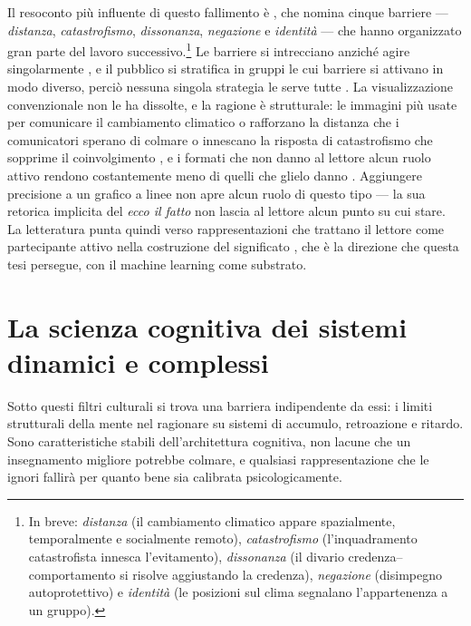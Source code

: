 Il resoconto più influente di questo fallimento è \citet{stoknes2015}, che nomina cinque barriere --- \emph{distanza}, \emph{catastrofismo}, \emph{dissonanza}, \emph{negazione} e \emph{identità} --- che hanno organizzato gran parte del lavoro successivo.\footnote{In breve: \emph{distanza} (il cambiamento climatico appare spazialmente, temporalmente e socialmente remoto), \emph{catastrofismo} (l'inquadramento catastrofista innesca l'evitamento), \emph{dissonanza} (il divario credenza--comportamento si risolve aggiustando la credenza), \emph{negazione} (disimpegno autoprotettivo) e \emph{identità} (le posizioni sul clima segnalano l'appartenenza a un gruppo).} Le barriere si intrecciano anziché agire singolarmente \citep{vanderlinden2015}, e il pubblico si stratifica in gruppi le cui barriere si attivano in modo diverso, perciò nessuna singola strategia le serve tutte \citep{leiserowitz2021}. La visualizzazione convenzionale non le ha dissolte, e la ragione è strutturale: le immagini più usate per comunicare il cambiamento climatico o rafforzano la distanza che i comunicatori sperano di colmare o innescano la risposta di catastrofismo che sopprime il coinvolgimento \citep{cornerclimate2015, nicholsoncole2005}, e i formati che non danno al lettore alcun ruolo attivo rendono costantemente meno di quelli che glielo danno \citep{ojala2023}. Aggiungere precisione a un grafico a linee non apre alcun ruolo di questo tipo --- la sua retorica implicita del \emph{ecco il fatto} non lascia al lettore alcun punto su cui stare. La letteratura punta quindi verso rappresentazioni che trattano il lettore come partecipante attivo nella costruzione del significato \citep{marlon2019, morris2019}, che è la direzione che questa tesi persegue, con il machine learning come substrato.

\section{La scienza cognitiva dei sistemi dinamici e complessi}
\label{sec:cognitive-science}

Sotto questi filtri culturali si trova una barriera indipendente da essi: i limiti strutturali della mente nel ragionare su sistemi di accumulo, retroazione e ritardo. Sono caratteristiche stabili dell'architettura cognitiva, non lacune che un insegnamento migliore potrebbe colmare, e qualsiasi rappresentazione che le ignori fallirà per quanto bene sia calibrata psicologicamente.

